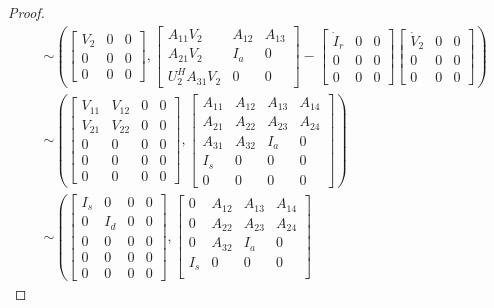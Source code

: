 \documentclass[]{book}
\theoremstyle{definition}
\theoremstyle{definition}
\theoremstyle{definition}
\theoremstyle{definition}
\theoremstyle{remark}
\begin{document}
\begin{proof}
\begin{align*}
& \sim   
\left(\begin{bmatrix}
V_2 & 0 & 0 \\
0 & 0 & 0 \\
0 & 0 & 0
\end{bmatrix},
\begin{bmatrix}
A_{11}V_2 & A_{12} & A_{13}\\
A_{21}V_2 & I_a & 0 \\
U_2^HA_{31}V_2 & 0 & 0
\end{bmatrix}
-
\begin{bmatrix}
\dot I_r & 0 & 0 \\
0 & 0 & 0 \\
0 & 0 & 0
\end{bmatrix}
\begin{bmatrix}
\dot V_2 & 0 & 0 \\
0 & 0 & 0 \\
0 & 0 & 0
\end{bmatrix} \right)\\
& \sim   
\left(\begin{bmatrix}
V_{11} & V_{12} & 0 & 0 \\
V_{21} & V_{22} & 0 & 0 \\
0 & 0 & 0 & 0 \\
0 & 0 & 0 & 0 \\
0 & 0 & 0 & 0
\end{bmatrix},
\begin{bmatrix}
A_{11} & A_{12} & A_{13} & A_{14}  \\
A_{21} & A_{22} & A_{23} & A_{24}  \\
A_{31} & A_{32} & I_a & 0 \\
I_s & 0 & 0 & 0 \\
0 & 0 & 0 & 0
\end{bmatrix} \right)\\
& \sim   
\left(\begin{bmatrix}
I_s & 0 & 0 & 0 \\
0 & I_d & 0 & 0 \\
0 & 0 & 0 & 0 \\
0 & 0 & 0 & 0 \\
0 & 0 & 0 & 0
\end{bmatrix},
\begin{bmatrix}
0 & A_{12} & A_{13} & A_{14}  \\
0 & A_{22} & A_{23} & A_{24}  \\
0 & A_{32} & I_a & 0 \\
I_s & 0 & 0 & 0 \\

\end{bmatrix}
\end{align*}
\end{proof}
\end{document}
